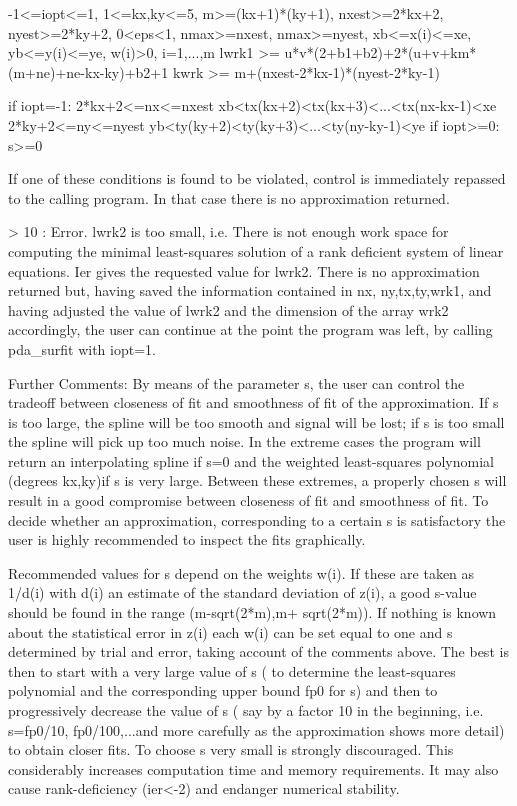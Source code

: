 \documentclass[11pt,twoside,nolof]{starlink}
\begin{document}
\begin{terminalv}
               -1<=iopt<=1, 1<=kx,ky<=5, m>=(kx+1)*(ky+1), nxest>=2*kx+2,
               nyest>=2*ky+2, 0<eps<1, nmax>=nxest, nmax>=nyest,
               xb<=x(i)<=xe, yb<=y(i)<=ye, w(i)>0, i=1,...,m
               lwrk1 >= u*v*(2+b1+b2)+2*(u+v+km*(m+ne)+ne-kx-ky)+b2+1
               kwrk >= m+(nxest-2*kx-1)*(nyest-2*ky-1)

               if iopt=-1: 2*kx+2<=nx<=nxest
                        xb<tx(kx+2)<tx(kx+3)<...<tx(nx-kx-1)<xe
                        2*ky+2<=ny<=nyest
                        yb<ty(ky+2)<ty(ky+3)<...<ty(ny-ky-1)<ye
               if iopt>=0: s>=0

               If one of these conditions is found to be violated, control
               is immediately repassed to the calling program. In that
               case there is no approximation returned.

        > 10 : Error. lwrk2 is too small, i.e. There is not enough work
               space for computing the minimal least-squares solution of
               a rank deficient system of linear equations. Ier gives the
               requested value for lwrk2. There is no approximation
               returned but, having saved the information contained in nx,
               ny,tx,ty,wrk1, and having adjusted the value of lwrk2 and
               the dimension of the array wrk2 accordingly, the user can
               continue at the point the program was left, by calling
               pda_surfit with iopt=1.

Further Comments:
   By means of the parameter s, the user can control the tradeoff between
   closeness of fit and smoothness of fit of the approximation. If s is
   too large, the spline will be too smooth and signal will be lost; if s
   is too small the spline will pick up too much noise. In the extreme
   cases the program will return an interpolating spline if s=0 and the
   weighted least-squares polynomial (degrees kx,ky)if s is very large.
   Between these extremes, a properly chosen s will result in a good
   compromise between closeness of fit and smoothness of fit. To decide
   whether an approximation, corresponding to a certain s is satisfactory
   the user is highly recommended to inspect the fits graphically.

   Recommended values for s depend on the weights w(i). If these are taken
   as 1/d(i) with d(i) an estimate of the standard deviation of z(i), a
   good s-value should be found in the range (m-sqrt(2*m),m+ sqrt(2*m)).
   If nothing is known about the statistical error in z(i) each w(i) can
   be set equal to one and s determined by trial and error, taking account
   of the comments above. The best is then to start with a very large
   value of s ( to determine the least-squares polynomial and the
   corresponding upper bound fp0 for s) and then to progressively decrease
   the value of s ( say by a factor 10 in the beginning, i.e. s=fp0/10,
   fp0/100,...and more carefully as the approximation shows more detail)
   to obtain closer fits. To choose s very small is strongly discouraged.
   This considerably increases computation time and memory requirements.
   It may also cause rank-deficiency (ier<-2) and endanger numerical
   stability.


\end{terminalv}
\end{document}
